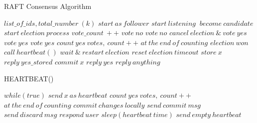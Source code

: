 \documentclass[12pt]{article}
\begin{document}
\begin{algorithm} []
	\caption{RAFT Consensus Algorithm}
	\label{alg:raft}
	\begin{algorithmic}[1]
		\Require $list\_of\_ids, total\_number \ (k)$
		\State $ start \ as \ follower$
		\State $ start \ listening \ $
			\State $ become \ candidate$
			\State $ start \ election \ process$
			\State $ vote\_count \ ++  $
		\Else
					\State $ vote \ no$
						\State $ vote  \ no$
						\State $cancel \ election \ \& \ vote \ yes$
						\State $vote \ yes$
					\Else 
						\State $vote \ yes$
					\EndIf
				\EndIf
				\State $ count \ yes \ votes,  \ count ++$
				\State $ at \ the \ end \ of \ counting$
						\State $ election \ won$
						\State $ call \ heartbeat() $
					\Else
						\State $ wait \ \& \ restart \ election$
					\EndIf
				\State $ reset \ election \ timeout$
					\State $ store \ x $
					\State $ reply \ yes\_stored$
					\State $ commit \ x$
					\State $ reply \ yes$	
				\Else
					\State $reply \ anything$			
				\EndIf
			\EndIf 
		\EndIf		
	\end{algorithmic}
\end{algorithm}


\begin{algorithm} []
	\caption{HEARTBEAT()}
	\label{alg:heartbeat}
	\begin{algorithmic}[1]
\State $while(true)$
	\State $ send \ x \ as \ heartbeat$
		\State $ count \ yes \ votes,  \ count ++$
		\State $ at \ the \ end \ of \ counting$
			\State $ commit \ changes \ locally$
			\State $ send \ commit \ msg$
		\Else
			\State $ send \ discard \ msg$
		\EndIf
		\State $ respond \ user$
	\EndIf
\State $sleep(heartbeat \ time)$
\Else
\State $send \ empty \ heartbeat$ 
\EndIf
\EndFunction

\end{algorithmic}
\end{algorithm}
\end{document}
